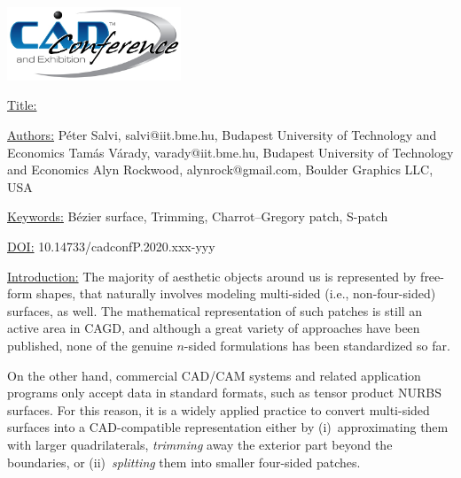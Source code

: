 \documentclass{article}
\begin{document}
{\centering  \includegraphics[width=5.173cm,height=2.193cm]{images/CADconverted-img001.jpg} \par}

\vspace{5pt}
\noindent
\underline{Title:}


\vspace{1em}
\noindent \underline{Authors:}
\newline
P\'eter Salvi, salvi@iit.bme.hu, Budapest University of Technology and Economics \newline
Tam\'as V\'arady, varady@iit.bme.hu, Budapest University of Technology and Economics \newline
Alyn Rockwood, alynrock@gmail.com, Boulder Graphics LLC, USA

\vspace{1em}
\noindent \underline{Keywords:}\newline
B\'ezier surface, Trimming, Charrot--Gregory patch, S-patch


\bigskip


\noindent \underline{DOI:} 10.14733/cadconfP.2020.xxx-yyy

\vspace{10pt}
\noindent\underline{Introduction:}\vspace{0.2em}\newline
The majority of aesthetic objects around us is represented by free-form shapes, that
naturally involves modeling multi-sided (i.e., non-four-sided) surfaces, as well.  The
mathematical representation of such patches is still an active area in CAGD, and although
a great variety of approaches have been published, none of the genuine $n$-sided
formulations has been standardized so far.

On the other hand, commercial CAD/CAM systems and related application programs only accept
data in standard formats, such as tensor product NURBS surfaces. For this reason, it is a
widely applied practice to convert multi-sided surfaces into a CAD-compatible
representation either by (i)~approximating them with larger quadrilaterals,
\emph{trimming} away the exterior part beyond the boundaries, or (ii)~\emph{splitting}
them into smaller four-sided patches.
\end{document}
